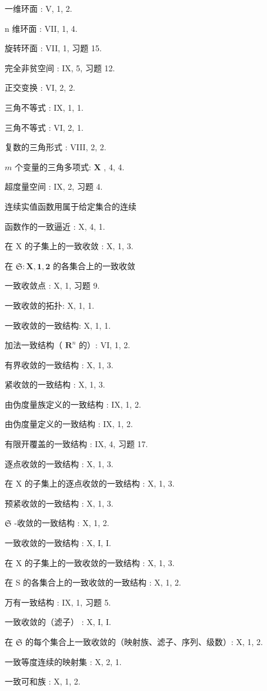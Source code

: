 一维环面 : V, 1, 2.

n 维环面 : VII, 1, 4.

旋转环面 : VII, 1, 习题 15.

完全非贫空间 : IX, 5, 习题 12.

正交变换 : VI, 2, 2.

三角不等式 : IX, 1, 1.

三角不等式 : VI, 2, 1.

复数的三角形式 : VIII, 2, 2.

\(m\) 个变量的三角多项式: \(\mathbf{X}\) , 4, 4.

超度量空间 : IX, 2, 习题 4.

连续实值函数用属于给定集合的连续

函数作的一致逼近 : X, 4, 1.

在 X 的子集上的一致收敛 : X, 1, 3.

在 \(\mathfrak{S}:\mathbf{X},\mathbf{1},\mathbf{2}\) 的各集合上的一致收敛

一致收敛点 : X, 1, 习题 9.

一致收敛的拓扑: X, 1, 1.

一致收敛的一致结构: X, 1, 1.

加法一致结构（ \(\mathbf{R}^n\) 的）: VI, 1, 2.

有界收敛的一致结构 : X, 1, 3.

紧收敛的一致结构 : X, 1, 3.

由伪度量族定义的一致结构 : IX, 1, 2.

由伪度量定义的一致结构 : IX, 1, 2.

有限开覆盖的一致结构 : IX, 4, 习题 17.

逐点收敛的一致结构 : X, 1, 3.

在 X 的子集上的逐点收敛的一致结构 : X, 1, 3.

预紧收敛的一致结构 : X, 1, 3.

\(\mathfrak{S}\) -收敛的一致结构 : X, 1, 2.

一致收敛的一致结构 : X, I, I.

在 X 的子集上的一致收敛的一致结构 : X, 1, 3.

在 S 的各集合上的一致收敛的一致结构 : X, 1, 2.

万有一致结构 : IX, 1, 习题 5.

一致收敛的（滤子） : X, I, I.

在 \(\mathfrak{S}\) 的每个集合上一致收敛的（映射族、滤子、序列、级数）: X, 1, 2.

一致等度连续的映射集 : X, 2, 1.

一致可和族 : X, 1, 2.

